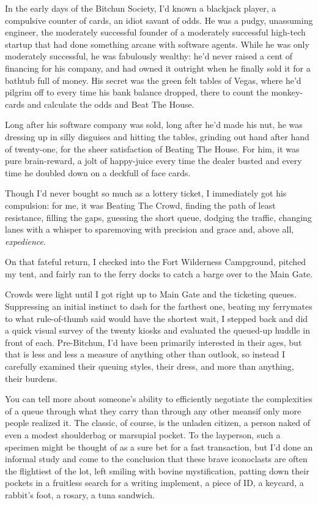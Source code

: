 In the early days of the Bitchun Society, I'd known a blackjack
player, a compulsive counter of cards, an idiot savant of odds. He
was a pudgy, unassuming engineer, the moderately successful founder
of a moderately successful high-tech startup that had done
something arcane with software agents. While he was only moderately
successful, he was fabulously wealthy: he'd never raised a cent of
financing for his company, and had owned it outright when he
finally sold it for a bathtub full of money. His secret was the
green felt tables of Vegas, where he'd pilgrim off to every time
his bank balance dropped, there to count the monkey-cards and
calculate the odds and Beat The House.

Long after his software company was sold, long after he'd made his
nut, he was dressing up in silly disguises and hitting the tables,
grinding out hand after hand of twenty-one, for the sheer
satisfaction of Beating The House. For him, it was pure
brain-reward, a jolt of happy-juice every time the dealer busted
and every time he doubled down on a deckfull of face cards.

Though I'd never bought so much as a lottery ticket, I immediately
got his compulsion: for me, it was Beating The Crowd, finding the
path of least resistance, filling the gaps, guessing the short
queue, dodging the traffic, changing lanes with a whisper to
spare{\dash}moving with precision and grace and, above all,
\emph{expedience}.

On that fateful return, I checked into the Fort Wilderness
Campground, pitched my tent, and fairly ran to the ferry docks to
catch a barge over to the Main Gate.

Crowds were light until I got right up to Main Gate and the
ticketing queues. Suppressing an initial instinct to dash for the
farthest one, beating my ferrymates to what rule-of-thumb said
would have the shortest wait, I stepped back and did a quick visual
survey of the twenty kiosks and evaluated the queued-up huddle in
front of each. Pre-Bitchun, I'd have been primarily interested in
their ages, but that is less and less a measure of anything other
than outlook, so instead I carefully examined their queuing styles,
their dress, and more than anything, their burdens.

You can tell more about someone's ability to efficiently negotiate
the complexities of a queue through what they carry than through
any other means{\dash}if only more people realized it. The classic, of
course, is the unladen citizen, a person naked of even a modest
shoulderbag or marsupial pocket. To the layperson, such a specimen
might be thought of as a sure bet for a fast transaction, but I'd
done an informal study and come to the conclusion that these brave
iconoclasts are often the flightiest of the lot, left smiling with
bovine mystification, patting down their pockets in a fruitless
search for a writing implement, a piece of ID, a keycard, a
rabbit's foot, a rosary, a tuna sandwich.

